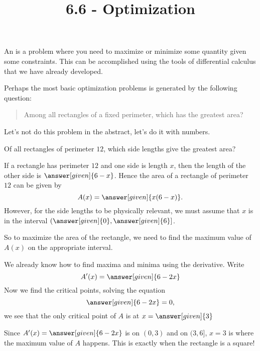 \documentclass{ximera}
\title{6.6 - Optimization}
\begin{document}
\begin{abstract}
\end{abstract}
\maketitle

An  is a problem where you need to maximize
or minimize some quantity given some constraints. This can be
accomplished using the tools of differential calculus that we have
already developed.

Perhaps the most basic optimization problems is generated by the
following question:

\begin{quote}
  Among all rectangles of a fixed perimeter, which has the greatest area?
\end{quote}

Let's not do this problem in the abstract, let's do it with numbers.

\begin{example}
  Of all rectangles of perimeter $12$, which side lengths give the greatest area?
  \begin{explanation}
    If a rectangle has perimeter $12$ and one side is length $x$, then
    the length of the other side is $\answer[given]{6-x}$.
    Hence the area of a rectangle of perimeter $12$ can be given by
    \[
    A(x) = \answer[given]{x(6-x)}.
    \]
    However, for the side lengths to be physically relevant, we must
    assume that $x$ is in the interval
    $(\answer[given]{0},\answer[given]{6}]$. 
      
    So to maximize the area of the rectangle, we need to find the
    maximum value of $A(x)$ on the appropriate interval.

   We already know how to find maxima and minima using the derivative. Write
    \[
    A'(x) = \answer[given]{6-2x}
    \]
    Now we find the critical points, solving the equation
    \[
    \answer[given]{6-2x} = 0,
    \]
    we see that the only critical point of $A$ is at $x=\answer[given]{3}$
    
    Since $A'(x) = \answer[given]{6-2x}$ is
     on
    $(0,3)$ and
     on
    $(3,6]$, $x=3$ is where the maximum value of $A$ happens.  This is
      exactly when the rectangle is a square!
  \end{explanation}
\end{example}
\end{document}
